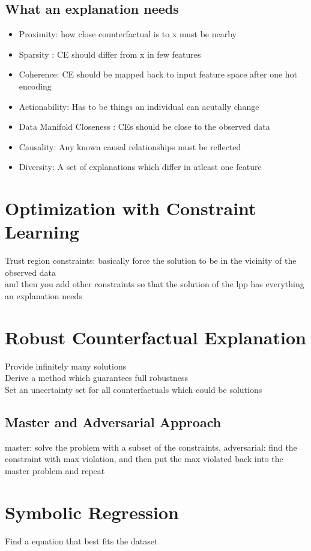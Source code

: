 \documentclass[11pt]{article}
\theoremstyle{definition}
\begin{document}
\subsection{What an explanation needs}
\begin{itemize}
  \item Proximity: how close counterfactual is to x must be nearby
  \item Sparsity : CE should differ from x in few features
  \item Coherence: CE should be mapped back to input feature space after one hot encoding
  \item Actionability: Has to be things an individual can acutally change
  \item Data Manifold Closeness : CEs should be close to the observed data
  \item Causality: Any known causal relationships must be reflected
  \item Diversity: A set of explanations which differ in atleast one feature
\end{itemize}
\section{Optimization with Constraint Learning}
Trust region constraints: basically force the solution to be in the vicinity of the observed data\\
and then you add other constraints so that the solution of the lpp has everything an explanation needs
\section{Robust Counterfactual Explanation}
Provide infinitely many solutions\\
Derive a method which guarantees full robustness\\
Set an uncertainty set for all counterfactuals which could be solutions\\
\subsection{Master and Adversarial Approach}
master: solve the problem with a subset of the constraints, adversarial: find the constraint with max violation, and then put the max violated back into the master problem and repeat
\section{Symbolic Regression}
Find a equation that best fits the dataset
\end{document}
